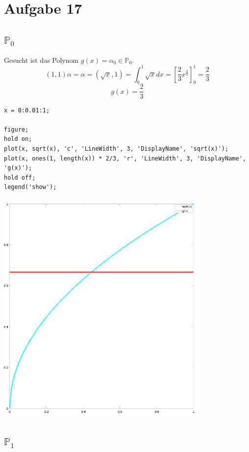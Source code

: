 \documentclass[10pt,a4paper]{article}
\begin{document}
\section{Aufgabe 17}

\subsection{$\mathbb{P}_{0}$}

Gesucht ist das Polynom $g(x) = \alpha_{0} \in \mathbb{P}_{0}$.
\begin{equation}
  (1, 1)\alpha = \alpha = (\sqrt{x}, 1) = \int_{0}^{1} \sqrt{x} dx = [\frac{2}{3}x^{\frac{3}{2}}]_{0}^{1} = \frac{2}{3}
\end{equation}
\begin{equation}
  g(x) = \frac{2}{3}
\end{equation}

\begin{lstlisting}
x = 0:0.01:1;

figure;
hold on;
plot(x, sqrt(x), 'c', 'LineWidth', 3, 'DisplayName', 'sqrt(x)');
plot(x, ones(1, length(x)) * 2/3, 'r', 'LineWidth', 3, 'DisplayName', 'g(x)');
hold off;
legend('show');
\end{lstlisting}

\includegraphics[width=300pt]{6_17_p0.png}

\subsection{$\mathbb{P}_{1}$}
\end{document}

